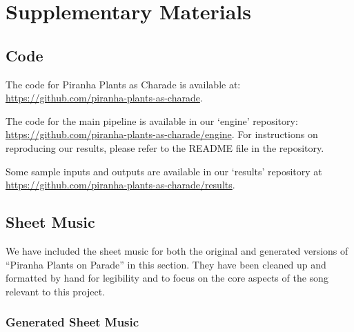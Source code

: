 \section{Supplementary Materials}
\label{sec:supplementary}

\subsection{Code}
\label{sec:code}

The code for Piranha Plants as Charade is available at: \url{https://github.com/piranha-plants-as-charade}.

The code for the main pipeline is available in our `engine' repository: \url{https://github.com/piranha-plants-as-charade/engine}. For instructions on reproducing our results, please refer to the README file in the repository.

Some sample inputs and outputs are available in our `results' repository at \url{https://github.com/piranha-plants-as-charade/results}.

\subsection{Sheet Music}
\label{sec:sheet_music}

We have included the sheet music for both the original and generated versions of ``Piranha Plants on Parade'' in this section. They have been cleaned up and formatted by hand for legibility and to focus on the core aspects of the song relevant to this project.

\clearpage
\subsubsection{Generated Sheet Music}
\label{sec:sheet_music_generated}

